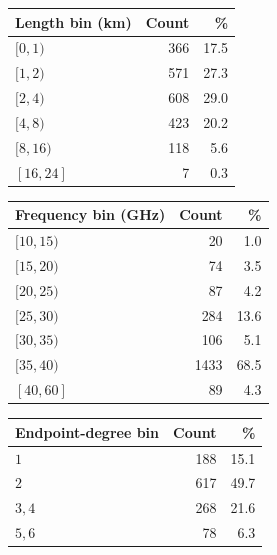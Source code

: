 \documentclass[a4paper,fleqn]{cas-sc}
\begin{document}
\begin{table}[!htbp]
  \centering
  \begin{minipage}[t]{0.31\textwidth}
    \centering
    \scriptsize
    \begin{tabular}{lrr}
      \toprule
      Length bin (km) & Count & \%   \\
      \midrule
      $[0,1)$         & 366   & 17.5 \\
      $[1,2)$         & 571   & 27.3 \\
      $[2,4)$         & 608   & 29.0 \\
      $[4,8)$         & 423   & 20.2 \\
      $[8,16)$        & 118   & 5.6  \\
      $[16,24]$       & 7     & 0.3  \\
      \bottomrule
    \end{tabular}
  \end{minipage}
  \hfill
  \begin{minipage}[t]{0.31\textwidth}
    \centering
    \scriptsize
    \begin{tabular}{lrr}
      \toprule
      Frequency bin (GHz) & Count & \%   \\
      \midrule
      $[10,15)$           & 20    & 1.0  \\
      $[15,20)$           & 74    & 3.5  \\
      $[20,25)$           & 87    & 4.2  \\
      $[25,30)$           & 284   & 13.6 \\
      $[30,35)$           & 106   & 5.1  \\
      $[35,40)$           & 1433  & 68.5 \\
      $[40,60]$           & 89    & 4.3  \\
      \bottomrule
    \end{tabular}
  \end{minipage}
  \hfill
  \begin{minipage}[t]{0.31\textwidth}
    \centering
    \scriptsize
    \begin{tabular}{lrr}
      \toprule
      Endpoint-degree bin & Count & \%   \\
      \midrule
      $1$                 & 188   & 15.1 \\
      $2$                 & 617   & 49.7 \\
      $3,4$               & 268   & 21.6 \\
      $5,6$               & 78    & 6.3  \\

\end{tabular}
\end{minipage}
\end{table}
\end{document}
